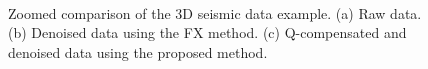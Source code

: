 \begin{figure}[htb!]
 \centering
 \\
  \caption{Zoomed comparison of the 3D seismic data example. (a) Raw data. (b) Denoised data using the FX method. (c) Q-compensated and denoised data using the proposed method.}
  \label{fig:real3-z,real3-d2-z,real3-d1-z}
\end{figure}


